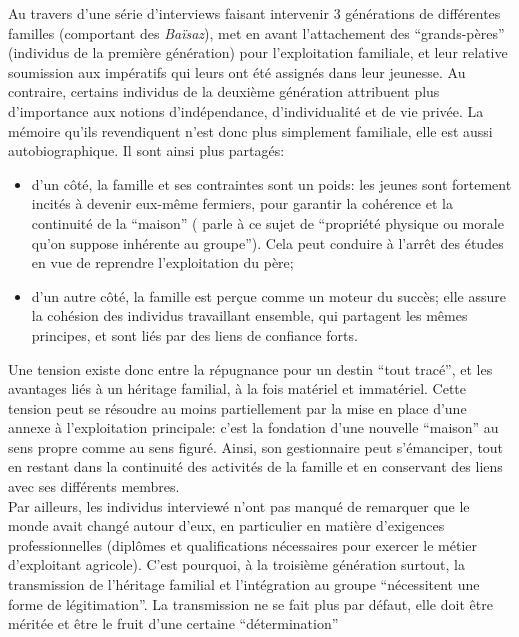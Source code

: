 \documentclass[french]{article}
\begin{document}
			Au travers d'une série d'interviews faisant intervenir 3 générations de différentes familles (comportant des \textit{Baïsaz}), \cite{boesen2012} met en avant l'attachement des ``grands-pères'' (individus de la première génération) pour l'exploitation familiale, et leur relative soumission aux impératifs qui leurs ont été assignés dans leur jeunesse. Au contraire, certains individus de la deuxième génération attribuent plus d'importance aux notions d'indépendance, d'individualité et de vie privée. La mémoire qu'ils revendiquent n'est donc plus simplement familiale, elle est aussi autobiographique. Il sont ainsi plus partagés:
			\begin{itemize}
				\item d'un côté, la famille et ses contraintes sont un poids: les jeunes sont fortement incités à devenir eux-même fermiers, pour garantir la cohérence et la continuité de la ``maison'' (\cite{halbwachs1925} parle à ce sujet de ``propriété physique ou morale qu'on suppose inhérente au groupe''). Cela peut conduire à l'arrêt des études en vue de reprendre l'exploitation du père;
				\item d'un autre côté, la famille est perçue comme un moteur du succès; elle assure la cohésion des individus travaillant ensemble, qui partagent les mêmes principes, et sont liés par des liens de confiance forts.
			\end{itemize}
			Une tension existe donc entre la répugnance pour un destin ``tout tracé'', et les avantages liés à un héritage familial, à la fois matériel et immatériel. Cette tension peut se résoudre au moins partiellement par la mise en place d'une annexe à l'exploitation principale: c'est la fondation d'une nouvelle ``maison'' au sens propre comme au sens figuré. Ainsi, son gestionnaire peut s'émanciper, tout en restant dans la continuité des activités de la famille et en conservant des liens avec ses différents membres.\\
			
			Par ailleurs, les individus interviewé n'ont pas manqué de remarquer que le monde avait changé autour d'eux, en particulier en matière d'exigences professionnelles (diplômes et qualifications nécessaires pour exercer le métier d'exploitant agricole). C'est pourquoi, à la troisième génération surtout, la transmission de l'héritage familial et l'intégration au groupe ``nécessitent une forme de légitimation''. La transmission ne se fait plus par défaut, elle doit être méritée et être le fruit  d'une certaine ``détermination''
			
\end{document}
